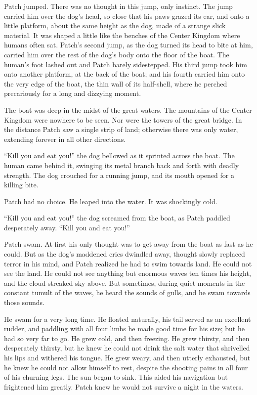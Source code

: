 \documentclass[ebook,oneside,openany,17pt]{memoir}
\newenvironment{tolerant}[1]{%
  \par\tolerance=#1\relax
}{%
  \par
}
\begin{document}
\begin{tolerant}{1000}
Patch jumped. There was no thought in this jump, only instinct. The
jump carried him over the dog’s head, so close that his paws grazed
its ear, and onto a little platform, about the same height as the dog,
made of a strange slick material. It was shaped a little like the
benches of the Center Kingdom where humans often sat. Patch’s second
jump, as the dog turned its head to bite at him, carried him over the
rest of the dog’s body onto the floor of the boat. The human’s foot
lashed out and Patch barely side\-stepped. His third jump took him onto
another platform, at the back of the boat; and his fourth carried him
onto the very edge of the boat, the thin wall of its half-shell, where
he perched precariously for a long and dizzying moment.
\end{tolerant}

The boat was deep in the midst of the great waters. The mountains of
the Center Kingdom were nowhere to be seen. Nor were the towers of the
great bridge. In the distance Patch saw a single strip of land;
otherwise there was only water, extending forever in all other
directions.

\begin{tolerant}{1000}
“Kill you and eat you!” the dog bellowed as it sprinted across the
boat. The human came behind it, swinging its metal branch back and
forth with deadly strength. The dog crouched for a running jump, and
its mouth opened for a killing bite.
\end{tolerant}

Patch had no choice. He leaped into the water. It was shockingly cold.

“Kill you and eat you!” the dog screamed from the boat, as Patch
paddled desperately away. “Kill you and eat you!”

Patch swam. At first his only thought was to get away from the boat as
fast as he could. But as the dog’s maddened cries dwindled away,
thought slowly replaced terror in his mind, and Patch realized he had
to swim towards land. He could not see the land. He could not see
anything but enormous waves ten times his height, and the
cloud-streaked sky above. But sometimes, during quiet moments in the
constant tumult of the waves, he heard the sounds of gulls, and he
swam towards those sounds.

He swam for a very long time. He floated naturally, his tail served as
an excellent rudder, and paddling with all four limbs he made good
time for his size; but he had so very far to go. He grew cold, and
then freezing. He grew thirsty, and then desperately thirsty, but he
knew he could not drink the salt water that shrivelled his lips and
withered his tongue. He grew weary, and then utterly exhausted, but he
knew he could not allow himself to rest, despite the shooting pains in
all four of his churning legs. The sun began to sink. This aided his
navigation but frightened him greatly. Patch knew he would not survive
a night in the waters.
\end{document}
